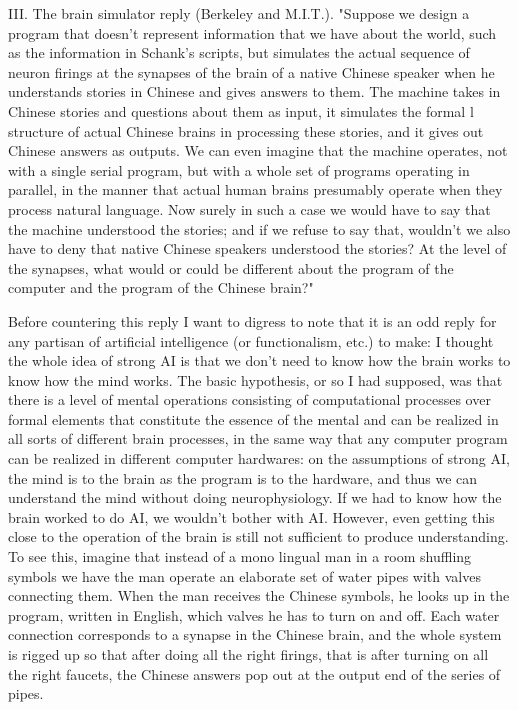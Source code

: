 III. The brain simulator reply (Berkeley and M.I.T.). "Suppose we design a program that doesn't represent
information that we have about the world, such as the information in Schank's scripts, but simulates the actual
sequence of neuron firings at the synapses of the brain of a native Chinese speaker when he understands stories
in Chinese and gives answers to them. The machine takes in Chinese stories and questions about them as input,
it simulates the formal l structure of actual Chinese brains in processing these stories, and it gives out Chinese
answers as outputs. We can even imagine that the machine operates, not with a single serial program, but with a
whole set of programs operating in parallel, in the manner that actual human brains presumably operate when
they process natural language. Now surely in such a case we would have to say that the machine understood
the stories; and if we refuse to say that, wouldn't we also have to deny that native Chinese speakers understood
the stories? At the level of the synapses, what would or could be different about the program of the computer
and the program of the Chinese brain?"

Before countering this reply I want to digress to note that it is an odd reply for any partisan of artificial
intelligence (or functionalism, etc.) to make: I thought the whole idea of strong AI is that we don't need to know
how the brain works to know how the mind works. The basic hypothesis, or so I had supposed, was that there
is a level of mental operations consisting of computational processes over formal elements that constitute the
essence of the mental and can be realized in all sorts of different brain processes, in the same way that any
computer program can be realized in different computer hardwares: on the assumptions of strong AI, the mind
is to the brain as the program is to the hardware, and thus we can understand the mind without doing
neurophysiology. If we had to know how the brain worked to do AI, we wouldn't bother with AI. However,
even getting this close to the operation of the brain is still not sufficient to produce understanding. To see this,
imagine that instead of a mono lingual man in a room shuffling symbols we have the man operate an elaborate
set of water pipes with valves connecting them. When the man receives the Chinese symbols, he looks up in the
program, written in English, which valves he has to turn on and off. Each water connection corresponds to a
synapse in the Chinese brain, and the whole system is rigged up so that after doing all the right firings, that is
after turning on all the right faucets, the Chinese answers pop out at the output end of the series of pipes.

